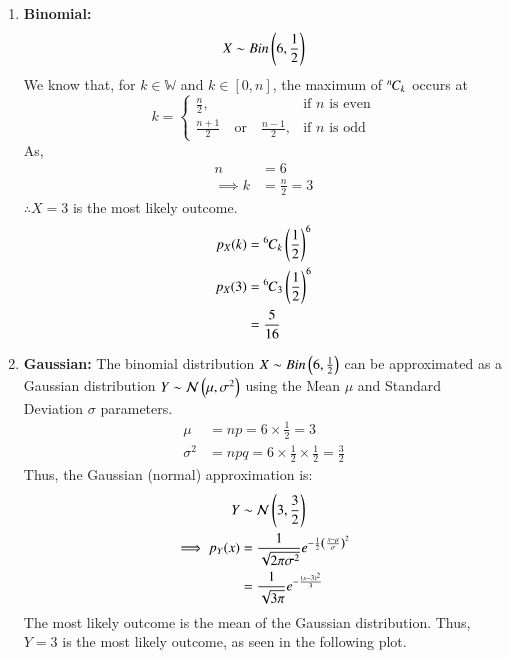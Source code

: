 \documentclass[journal,12pt,twocolumn]{IEEEtran}
\theoremstyle{remark}
\begin{document}
\begin{enumerate}
\item \textbf{Binomial:}
\begin{align}
    X \sim Bin\left(6,\frac{1}{2}\right) 
\end{align}
We know that, for $k \in \mathbb{W}$ and $k \in [0,n]$, the maximum of ${{}^{n}\mkern-1muC_{k}}$ occurs at
\begin{equation}
    k =
    \begin{cases}
        \frac{n}{2}, & \text{if } n \text{ is even} \\
        \frac{n+1}{2} \quad \text{or} \quad \frac{n-1}{2}, & \text{if } n \text{ is odd} 
    \end{cases}
\end{equation}
As, 
\begin{align}
   	n&=6\\
   	\implies k&=\frac{n}{2}
   	=3
\end{align}
$\therefore X = 3$ is the most likely outcome.
\begin{align}
    p_X(k) &= {{}^{6}\mkern-1muC_{k}} \left(\frac{1}{2}\right)^6 \\
    p_X(3) &= {{}^{6}\mkern-1muC_{3}} \left(\frac{1}{2}\right)^6 \\
    &= \frac{5}{16}
\end{align}
\item \textbf{Gaussian:}
The binomial distribution $X \sim Bin\left(6,\frac{1}{2}\right)$ can be approximated as a Gaussian distribution $Y \sim \mathcal{N}\left(\mu, \sigma^2\right)$ using the Mean $\mu$ and Standard Deviation $\sigma$ parameters.
\begin{align}
    \mu &= np = 6 \times \frac{1}{2} = 3\\
    \sigma^2 &= npq = 6 \times \frac{1}{2} \times \frac{1}{2} = \frac{3}{2}
\end{align}
Thus, the Gaussian (normal) approximation is:
\begin{align}
    Y &\sim \mathcal{N}\left(3, \frac{3}{2}\right)\\
    \implies p_Y(x) &= \frac{1}{\sqrt{2\pi\sigma^2}}e^{-\frac{1}{2} \left(\frac{x - \mu}{\sigma}\right)^2}\\
    &= \frac{1}{\sqrt{3\pi}}e^{-\frac{\left(x - 3\right)^2}{3}}
\end{align}
The most likely outcome is the mean of the Gaussian distribution. Thus, $Y = 3$ is the most likely outcome, as seen in the following plot.
\end{enumerate}
\end{document}

